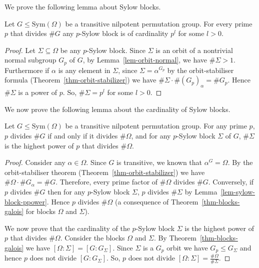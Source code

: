 \documentclass[prodmod,acmtalg]{acmsmall}
\newcommand{\Sym}[1]{{\ensuremath{\mathrm{Sym}\left(#1\right)}}}
\begin{document}
We prove the following lemma about Sylow blocks.

\begin{lemma}\label{lem-sylow-block-ppower}
  Let $G\leq\Sym{\Omega}$ be a transitive nilpotent permutation group.
  For every prime $p$ that divides $\# G$ any $p$-Sylow block is of
  cardinality $p^l$ for some $l >0$.
\end{lemma}
\begin{proof}
  Let $\Sigma \subseteq \Omega$ be any $p$-Sylow block. Since $\Sigma$
  is an orbit of a nontrivial normal subgroup $G_p$ of $G$, by
  Lemma~\ref{lem-orbit-normal}, we have $\# \Sigma > 1$. Furthermore
  if $\alpha$ is any element in $\Sigma$, since $\Sigma =
  \alpha^{G_p}$ by the orbit-stabiliser formula
  (Theorem~\ref{thm-orbit-stabilizer}) we have $\# \Sigma \cdot \#
  (G_{p})_{\alpha} = \# G_p$. Hence $\# \Sigma$ is a power of $p$. So,
  $\# \Sigma = p^l$ for some $l >0$.
\end{proof}

We now prove the following lemma about the cardinality of Sylow
blocks.

\begin{lemma}\label{lem-sylow-cardinality}
  Let $G\leq\Sym{\Omega}$ be a transitive nilpotent permutation group.
  For any prime $p$, $p$ divides $\# G$ if and only if it divides $\#
  \Omega$, and for any $p$-Sylow block $\Sigma$ of $G$, $\# \Sigma$ is
  the highest power of $p$ that divides $\# \Omega$.
\end{lemma}
\begin{proof}
  Consider any $\alpha \in \Omega$. Since $G$ is transitive, we known
  that $\alpha^G = \Omega$. By the orbit-stabiliser theorem
  (Theorem~\ref{thm-orbit-stabilizer}) we have $\# \Omega \cdot \#
  G_\alpha = \# G$. Therefore, every prime factor of $\# \Omega$
  divides $\# G$. Conversely, if $p$ divides $\# G$ then for any
  $p$-Sylow block $\Sigma$, $p$ divides $\# \Sigma$ by
  Lemma~\ref{lem-sylow-block-ppower}. Hence $p$ divides $\# \Omega$ (a
  consequence of Theorem~\ref{thm-blocks-galois} for blocks $\Omega$
  and $\Sigma$).

  We now prove that the cardinality of the $p$-Sylow block $\Sigma$ is
  the highest power of $p$ that divides $\# \Omega$. Consider the
  blocks $\Omega$ and $\Sigma$. By Theorem~\ref{thm-blocks-galois} we
  have $[\Omega: \Sigma] = [G: G_\Sigma]$. Since $\Sigma$ is a $G_p$
  orbit we have $G_p \leq G_\Sigma$ and hence $p$ does not divide
  $[G:G_\Sigma]$. So, $p$ does not divide $[\Omega:\Sigma] =
  \frac{\# \Omega}{\# \Sigma}$.
\end{proof}
\end{document}
